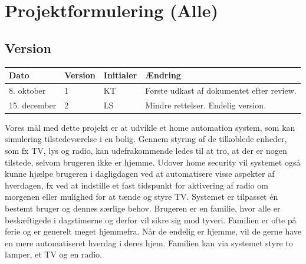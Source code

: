 \chapter{Projektformulering (Alle)}

\section{Version}
\begin{table}[h]
	\centering
	\begin{tabularx}{\textwidth}{|l|l| l|X|}
	\hline
	Dato	& Version	& Initialer & Ændring	\\ \hline
	8. oktober & 1 & KT	& Første udkast af dokumentet efter review. \\ \hline
	15. december & 2 & LS & Mindre rettelser. Endelig version. \\ \hline
	\end{tabularx}
\end{table}

Vores mål med dette projekt er at udvikle et home automation system, som kan simulering tilstedeværelse i en bolig. Gennem styring af de tilkoblede enheder, som fx TV, lys og radio, kan udefrakommende ledes til at tro, at der er nogen tilstede, selvom brugeren ikke er hjemme. Udover home security vil systemet også kunne hjælpe brugeren i dagligdagen ved at automatisere visse aspekter af hverdagen, fx ved at indstille et fast tidspunkt for aktivering af radio om morgenen eller mulighed for at tænde og styre TV. Systemet er tilpasset én bestemt bruger og dennes særlige behov. Brugeren er en familie, hvor alle er beskæftigede i dagstimerne og derfor vil sikre sig mod tyveri. Familien er ofte på ferie og er generelt meget hjemmefra. Når de endelig er hjemme, vil de gerne have en mere automatiseret hverdag i deres hjem. Familien kan via systemet styre to lamper, et TV og en radio. 


